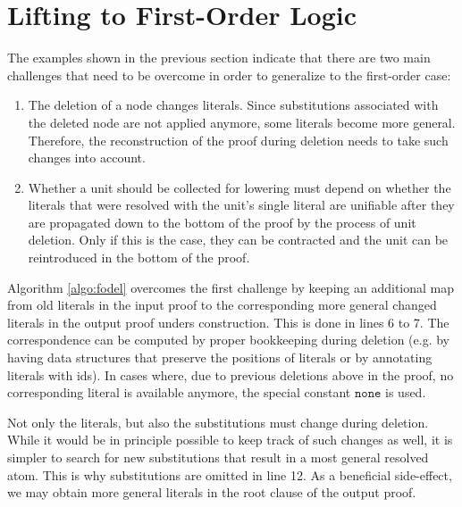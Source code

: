 \section{Lifting \LowerUnits to First-Order Logic} \label{sec:FOLU}

The examples shown in the previous section indicate that there are two main challenges that need to be overcome in order to generalize \LowerUnits to the first-order case:
\begin{enumerate}
\item The deletion of a node changes literals. Since substitutions associated with the deleted node are not applied anymore, some literals become more general. Therefore, the reconstruction of the proof during deletion needs to take such changes into account.
\item Whether a unit should be collected for lowering must depend on whether the literals that were resolved with the unit's single literal are unifiable after they are propagated down to the bottom of the proof by the process of unit deletion. Only if this is the case, they can be contracted and the unit can be reintroduced in the bottom of the proof.
\end{enumerate}

\newcommand{\none}{\texttt{none}}

\noindent
Algorithm \ref{algo:fodel} overcomes the first challenge by keeping an additional map from old literals in the input proof to the corresponding more general changed literals in the output proof unders construction. This is done in lines 6 to 7. The correspondence can be computed by proper bookkeeping during deletion (e.g. by having data structures that preserve the positions of literals or by annotating literals with ids). In cases where, due to previous deletions above in the proof, no corresponding literal is available anymore, the special constant $\none$ is used. 

Not only the literals, but also the substitutions must change during deletion. While it would be in principle possible to keep track of such changes as well, it is simpler to search for new substitutions that result in a most general resolved atom. This is why substitutions are omitted in line 12. As a beneficial side-effect, we may obtain more general literals in the root clause of the output proof.



\newcommand{\dl}[1]{#1^{\dagger}}

